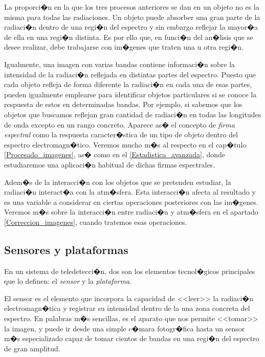 La proporci�n en la que los tres procesos anteriores se dan en un objeto no es la misma para todas las radiaciones. Un objeto puede absorber una gran parte de la radiaci�n dentro de una regi�n del espectro y sin embargo reflejar la mayor�a de ella en una regi�n distinta. Es por ello que, en funci�n del an�lisis que se desee realizar, debe trabajarse con im�genes que traten una u otra regi�n.

Igualmente, una imagen con varias bandas contiene informaci�n sobre la intensidad de la radiaci�n reflejada en distintas partes del espectro. Puesto que cada objeto refleja de forma diferente la radiaci�n en cada una de esas partes, pueden igualmente emplearse para identificar objetos particulares si se conoce la respuesta de estos en determinadas bandas. Por ejemplo, si sabemos que los objetos que buscamos reflejan gran cantidad de radiaci�n en todas las longitudes de onda excepto en un rango concreto. Aparece as� el concepto de \emph{firma espectral} como la respuesta caracter�stica de un tipo de objeto dentro del espectro electromagn�tico. Veremos mucho m�s al respecto en el cap�tulo \ref{Procesado_imagenes}, as� como en el \ref{Estadistica_avanzada}, donde estudiaremos una aplicaci�n habitual de dichas firmas espectrales.

Adem�s de la interacci�n con los objetos que se pretenden estudiar, la radiaci�n interact�a con la atm�sfera. Esta interacci�n afecta al resultado y es una variable a considerar en ciertas operaciones posteriores con las im�genes. Veremos m�s sobre la interacci�n entre radiaci�n y atm�sfera en el apartado \ref{Correccion_imagenes}, cuando tratemos esas operaciones.

\subsection{Sensores y plataformas}

En un sistema de teledetecci�n, dos son los elementos tecnol�gicos principales que lo definen: el \emph{sensor} y la \emph{plataforma}. 

El sensor es el elemento que incorpora la capacidad de <<leer>> la radiaci�n electromagn�tica y registrar su intensidad dentro de la una zona concreta del espectro. En palabras m�s sencillas, es el aparato que nos permite <<tomar>> la imagen, y puede ir desde una simple c�mara fotogr�fica hasta un sensor m�s especializado capaz de tomar cientos de bandas en una regi�n del espectro de gran amplitud.

